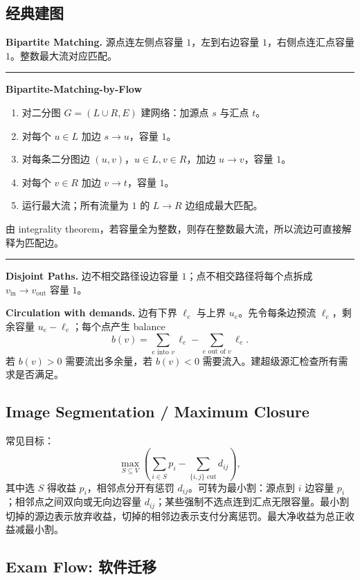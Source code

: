 \documentclass[UTF8,a4paper,11pt]{ctexart}
\newenvironment{algobox}[1]
{\par\medskip\noindent\begin{minipage}{0.96\linewidth}\hrule\vspace{0.35em}\textbf{#1}\par\vspace{0.25em}\small}
{\par\vspace{0.25em}\hrule\end{minipage}\par\medskip}
\begin{document}
\subsection{经典建图}

\textbf{Bipartite Matching.} 源点连左侧点容量 $1$，左到右边容量 $1$，右侧点连汇点容量 $1$。整数最大流对应匹配。

\begin{algobox}{Bipartite-Matching-by-Flow}
\begin{enumerate}
  \item 对二分图 $G=(L\cup R,E)$ 建网络：加源点 $s$ 与汇点 $t$。
  \item 对每个 $u\in L$ 加边 $s\to u$，容量 $1$。
  \item 对每条二分图边 $(u,v)$，$u\in L,v\in R$，加边 $u\to v$，容量 $1$。
  \item 对每个 $v\in R$ 加边 $v\to t$，容量 $1$。
  \item 运行最大流；所有流量为 $1$ 的 $L\to R$ 边组成最大匹配。
\end{enumerate}
由 integrality theorem，若容量全为整数，则存在整数最大流，所以流边可直接解释为匹配边。
\end{algobox}

\textbf{Disjoint Paths.} 边不相交路径设边容量 $1$；点不相交路径将每个点拆成 $v_{\mathrm{in}}\to v_{\mathrm{out}}$ 容量 $1$。

\textbf{Circulation with demands.} 边有下界 $\ell_e$ 与上界 $u_e$。先令每条边预流 $\ell_e$，剩余容量 $u_e-\ell_e$；每个点产生 balance
\[
b(v)=\sum_{e\text{ into }v}\ell_e-\sum_{e\text{ out of }v}\ell_e.
\]
若 $b(v)>0$ 需要流出多余量，若 $b(v)<0$ 需要流入。建超级源汇检查所有需求是否满足。

\subsection{Image Segmentation / Maximum Closure}

常见目标：
\[
\max_{S\subseteq V}\left(\sum_{i\in S}p_i-\sum_{\{i,j\}\text{ cut}}d_{ij}\right),
\]
其中选 $S$ 得收益 $p_i$，相邻点分开有惩罚 $d_{ij}$。可转为最小割：源点到 $i$ 边容量 $p_i$；相邻点之间双向或无向边容量 $d_{ij}$；某些强制不选点连到汇点无限容量。最小割切掉的源边表示放弃收益，切掉的相邻边表示支付分离惩罚。最大净收益为总正收益减最小割。

\subsection{Exam Flow: 软件迁移}
\end{document}
